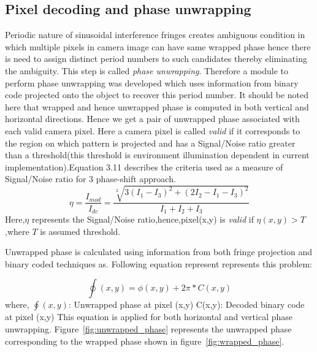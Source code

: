 \subsection{Pixel decoding and phase unwrapping}
Periodic nature of sinusoidal interference fringes creates ambiguous condition in which multiple pixels in camera image can have same wrapped phase hence there is need to assign distinct period numbers to such candidates thereby eliminating the ambiguity. This step is called \textit{phase unwrapping}. Therefore a module to perform phase unwrapping was developed which uses information from binary code projected onto the object to recover this period number. It should be noted here that wrapped and hence unwrapped phase is computed in both vertical and horizontal directions. Hence we get a pair of unwrapped phase associated with each valid camera pixel. Here a camera pixel is called \textit{valid} if it corresponds to the region on which pattern is projected and has a Signal/Noise ratio greater than a threshold(this threshold is environment illumination dependent in current implementation).Equation 3.11 describes the criteria used as a measure of Signal/Noise ratio for 3 phase-shift approach.
\begin{equation}
\eta=\frac{I_{mod}}{I_{dc}}=\frac{\sqrt[2]{3(I_1-I_3)^2+(2I_2-I_1-I_3)^2}}{I_1+I_2+I_3}
\end{equation}
Here,$\eta$ represents the Signal/Noise ratio,hence,pixel(x,y) is \textit{valid} if $\eta(x,y)>T$,where $T$ is assumed threshold.


Unwrapped phase is calculated using information from both fringe projection and binary coded techniques as. Following equation represent represents this problem:\newline

\begin{equation}
\oint(x,y)=\phi(x,y)+2\pi*C(x,y)
\end{equation}
\noindent
where,\newline
$\oint(x,y)$: Unwrapped phase at pixel (x,y)\newline
C(x,y): Decoded binary code at pixel (x,y)\newline
\noindent
This equation is applied for both horizontal and vertical phase unwrapping. Figure~\ref{fig:unwrapped_phase} represents the unwrapped phase corresponding to the wrapped phase shown in figure~\ref{fig:wrapped_phase}.

